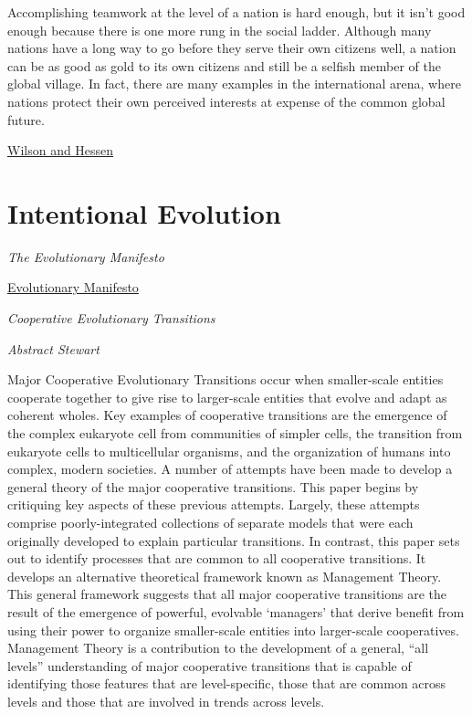 \documentclass[
]{book}
\begin{document}
Accomplishing teamwork at the level of a nation is hard enough, but it isn't good enough because there is one more rung in the social ladder. Although many nations have a long way to go before they serve their own citizens well, a nation can be as good as gold to its own citizens and still be a selfish member of the global village. In fact, there are many examples in the international arena, where nations protect their own perceived interests at expense of the common global future.

\href{https://evonomics.com/norway-toxic-trickle-down-david-sloan-wilson/}{Wilson and Hessen}

\hypertarget{intentional-evolution}{%
\section{Intentional Evolution}\label{intentional-evolution}}

\emph{The Evolutionary Manifesto}

\href{http://www.evolutionarymanifesto.com/}{Evolutionary Manifesto}

\emph{Cooperative Evolutionary Transitions}

\emph{Abstract Stewart}

Major Cooperative Evolutionary Transitions occur when smaller-scale entities cooperate together to give rise to larger-scale entities that evolve and adapt as coherent wholes. Key examples of cooperative transitions are the emergence of the complex eukaryote cell from communities of simpler cells, the transition from eukaryote cells to multicellular organisms, and the organization of humans into complex, modern societies. A number of attempts have been made to develop a general theory of the major cooperative transitions. This paper begins by critiquing key aspects of these previous attempts. Largely, these attempts comprise poorly-integrated collections of separate models that were each originally developed to explain particular transitions. In contrast, this paper sets out to identify processes that are common to all cooperative transitions. It develops an alternative theoretical framework known as Management Theory. This general framework suggests that all major cooperative transitions are the result of the emergence of powerful, evolvable `managers' that derive benefit from using their power to organize smaller-scale entities into larger-scale cooperatives. Management Theory is a contribution to the development of a general, ``all levels'' understanding of major cooperative transitions that is capable of identifying those features that are level-specific, those that are common across levels and those that are involved in trends across levels.
\end{document}
